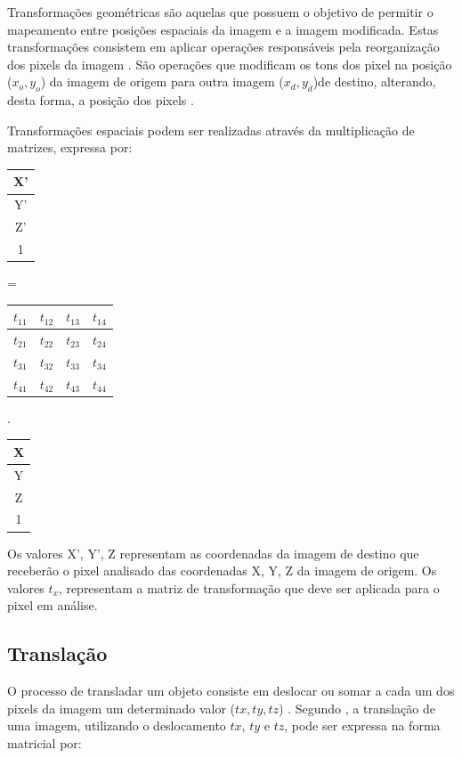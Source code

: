 \documentclass[
	12pt,				%
	oneside,			%
	a4paper,			%
	english,			%
	french,				%
	spanish,			%
	brazil,				%
	]{abntex2}
\begin{document}
Transformações geométricas são aquelas que possuem o objetivo de permitir o mapeamento entre posições espaciais da imagem e a imagem modificada. Estas transformações consistem em aplicar operações responsáveis pela reorganização dos pixels da imagem \cite{pedriniSchwartz:2008}. São operações que modificam os tons dos pixel na posição (\(x_o, y_o\)) da imagem de origem para outra imagem (\(x_d, y_d\))de destino, alterando, desta forma, a posição dos pixels \cite{conciAzevedoLeta:2008}.

Transformações espaciais podem ser realizadas através da multiplicação de matrizes, expressa por:

\begin{tabular}{|c|}
    \hline
	X’       \\ \hline
	Y’       \\ \hline
	Z’       \\ \hline
    1        \\ \hline
\end{tabular}
=
\begin{tabular}{|c|c|c|c|}
	\hline
    \(t_{11}\) & \(t_{12}\) & \(t_{13}\) & \(t_{14}\)   \\ \hline
	\(t_{21}\) & \(t_{22}\) & \(t_{23}\) & \(t_{24}\)   \\ \hline   
	\(t_{31}\) & \(t_{32}\) & \(t_{33}\) & \(t_{34}\)   \\ \hline   
	\(t_{41}\) & \(t_{42}\) & \(t_{43}\) & \(t_{44}\)   \\ \hline   
\end{tabular}
.
\begin{tabular}{|c|}
    \hline
	X       \\ \hline
	Y       \\ \hline
	Z       \\ \hline
    1        \\ \hline
\end{tabular}

Os valores X’, Y’, Z representam as coordenadas da imagem de destino que receberão o pixel analisado das coordenadas X, Y, Z da imagem de origem. Os valores \(t_x\), representam a matriz de transformação que deve ser aplicada para o pixel em análise.

\subsection{Translação}

O processo de transladar um objeto consiste em deslocar ou somar a cada um dos pixels da imagem um determinado valor (\(tx, ty, tz\)) \cite{conciAzevedoLeta:2008}. Segundo \citet{pedriniSchwartz:2008}, a translação de uma imagem, utilizando o deslocamento \(tx\), \(ty\) e \(tz\), pode ser expressa na forma matricial por:
\end{document}
